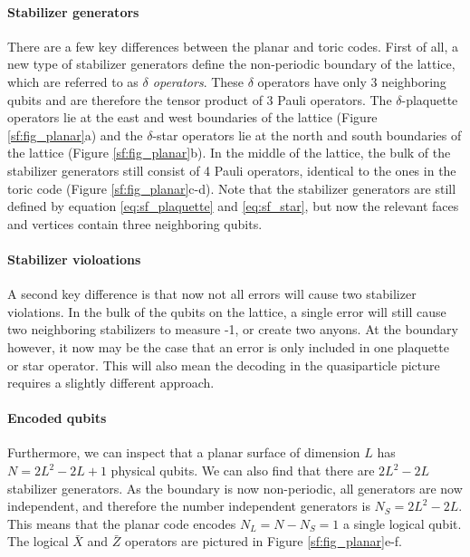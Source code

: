 \paragraph{Stabilizer generators}
There are a few key differences between the planar and toric codes. First of all, a new type of stabilizer generators define the non-periodic boundary of the lattice, which are referred to as \emph{$\delta$ operators}. These $\delta$ operators have only 3 neighboring qubits and are therefore the tensor product of 3 Pauli operators. The $\delta$-plaquette operators lie at the east and west boundaries of the lattice (Figure \ref{sf:fig_planar}a) and the $\delta$-star operators lie at the north and south boundaries of the lattice (Figure \ref{sf:fig_planar}b). In the middle of the lattice, the bulk of the stabilizer generators still consist of 4 Pauli operators, identical to the ones in the toric code (Figure \ref{sf:fig_planar}c-d). Note that the stabilizer generators are still defined by equation \eqref{eq:sf_plaquette} and \eqref{eq:sf_star}, but now the relevant faces and vertices contain three neighboring qubits.

\paragraph{Stabilizer violoations}
A second key difference is that now not all errors will cause two stabilizer violations. In the bulk of the qubits on the lattice, a single error will still cause two neighboring stabilizers to measure -1, or create two anyons. At the boundary however, it now may be the case that an error is only included in one plaquette or star operator. This will also mean the decoding in the quasiparticle picture requires a slightly different approach.

\paragraph{Encoded qubits}
Furthermore, we can inspect that a planar surface of dimension $L$ has $N = 2L^2-2L+1$ physical qubits. We can also find that there are $2L^2-2L$ stabilizer generators. As the boundary is now non-periodic, all generators are now independent, and therefore the number independent generators is $N_S = 2L^2-2L$. This means that the planar code encodes $N_L = N-N_S = 1$ a single logical qubit. The logical $\bar{X}$ and $\bar{Z}$ operators are pictured in Figure \ref{sf:fig_planar}e-f.

